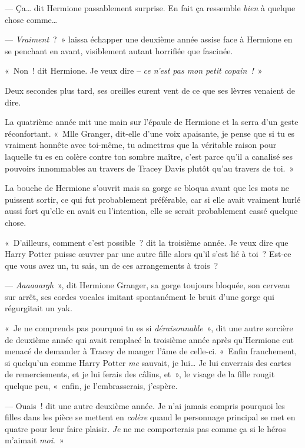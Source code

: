--- Ça… dit Hermione passablement surprise.
En fait ça ressemble \emph{bien} à quelque chose comme…

--- \emph{Vraiment}~?~»
laissa échapper une deuxième année assise face à Hermione en se penchant en avant, visiblement autant horrifiée que fascinée.

«~Non~! dit Hermione.
Je veux dire -- \emph{ce n'est pas mon petit copain~!}~»

Deux secondes plus tard, ses oreilles eurent vent de ce que ses lèvres venaient de dire.

La quatrième année mit une main sur l'épaule de Hermione et la serra d'un geste réconfortant.
«~Mlle Granger, dit-elle d'une voix apaisante, je pense que si tu es vraiment honnête avec toi-même, tu admettras que la véritable raison pour laquelle tu es en colère contre ton sombre maître, c'est parce qu'il a canalisé ses pouvoirs innommables au travers de Tracey Davis plutôt qu'au travers de toi.~»

La bouche de Hermione s'ouvrit mais sa gorge se bloqua avant que les mots ne puissent sortir, ce qui fut probablement préférable, car si elle avait vraiment hurlé aussi fort qu'elle en avait eu l'intention, elle se serait probablement cassé quelque chose.

«~D'ailleurs, comment c'est possible~? dit la troisième année.
Je veux dire que Harry Potter puisse œuvrer par une autre fille alors qu'il s'est lié à toi~?
Est-ce que vous avez un, tu sais, un de ces arrangements à trois~?

--- \emph{Aaaaaargh}~», dit Hermione Granger, sa gorge toujours bloquée, son cerveau sur arrêt, ses cordes vocales imitant spontanément le bruit d'une gorge qui régurgitait un yak.


«~Je ne comprends pas pourquoi tu es si \emph{déraisonnable}~», dit une autre sorcière de deuxième année qui avait remplacé la troisième année après qu'Hermione eut menacé de demander à Tracey de manger l'âme de celle-ci.
«~Enfin franchement, si quelqu'un comme Harry Potter \emph{me} sauvait, je lui…
Je lui enverrais des cartes de remerciements, et je lui ferais des câlins, et~», le visage de la fille rougit quelque peu, «~enfin, je l'embrasserais, j'espère.

--- Ouais~! dit une autre deuxième année.
Je n'ai jamais compris pourquoi les filles dans les pièce se mettent en \emph{colère} quand le personnage principal se met en quatre pour leur faire plaisir.
\emph{Je} ne me comporterais pas comme ça si le héros m'aimait \emph{moi}.~»

